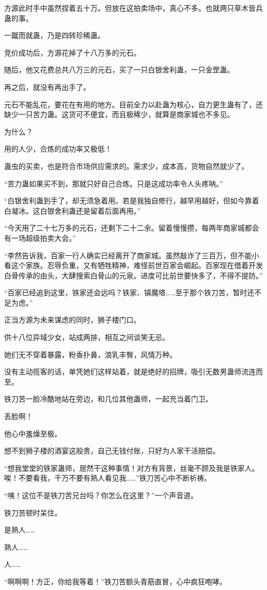 \begin{this_body}
方源此时手中虽然捏着五十万。但放在这拍卖场中，真心不多。也就两只草木皆兵蛊的事。

一蹴而就蛊，乃是四转珍稀蛊。

竞价成功后，方源花掉了十八万多的元石。

随后，他又花费总共八万三的元石，买了一只白银舍利蛊，一只金罡蛊。

再之后，就没有再出手了。

元石不能乱花，要花在有用的地方。目前全力以赴蛊为核心，自力更生蛊有了，还缺少一只苦力蛊。这货可不便宜，而且极稀少，就算是商家城也不多见。

为什么？

用的人少，合炼的成功率又极低！

蛊虫的买卖，也是符合市场供应需求的。需求少，成本高，货物自然就少了。

“苦力蛊如果买不到，那就只好自己合炼。只是这成功率令人头疼呐。”

“白银舍利蛊到手了，却无须急着用。若是我独自修行，越早用越好，但如今靠着白凝冰。这白银舍利蛊还是留着后面再用。”

“今天用了二十七万多的元石，还剩下二十二余。留着慢慢攒，每两年商家城都会有一场超级拍卖大会。”

“李然告诉我，百家一行人确实已经离开了商家城。虽然敲诈了三百万，但不能小看这个家族。忍辱负重，又有牺牲精神，难怪前世百家会崛起。百家现在借着开发白骨传承的由头，大肆搜索白骨山的元泉。进度可比前世要快多了，不得不提防。”

“百家已经追到这里，铁家还会远吗？铁家、镇魔塔……至于那个铁刀苦，暂时还不足为虑。”

正当方源为未来谋虑的同时，狮子楼门口。

供十八位异域少女，站成两排，相互之间谈笑无忌。

她们无不穿着暴露，粉香扑鼻，浪乳丰臀，风情万种。

没有主动揽客的话，单凭她们这样站着，就是绝好的招牌，吸引无数男蛊师流连而至。

铁刀苦一脸冷酷地站在旁边，和几位其他蛊师，一起充当着门卫。

丢脸啊！

他心中羞燥至极。

想不到狮子楼的酒宴这般贵，自己无钱付账，只好为人家干活赔偿。

“想我堂堂的铁家蛊师，居然干这种事情！对方有背景，丝毫不顾及我是铁家人。唉！不要看我，千万不要有熟人看见我……”铁刀苦心中不断祈祷。

“咦！这位不是铁刀苦兄台吗？你怎么在这里？”一个声音道。

铁刀苦顿时呆住。

是熟人……

熟人……

人……

“啊啊啊！方正，你给我等着！”铁刀苦额头青筋直冒，心中疯狂咆哮。

\end{this_body}


